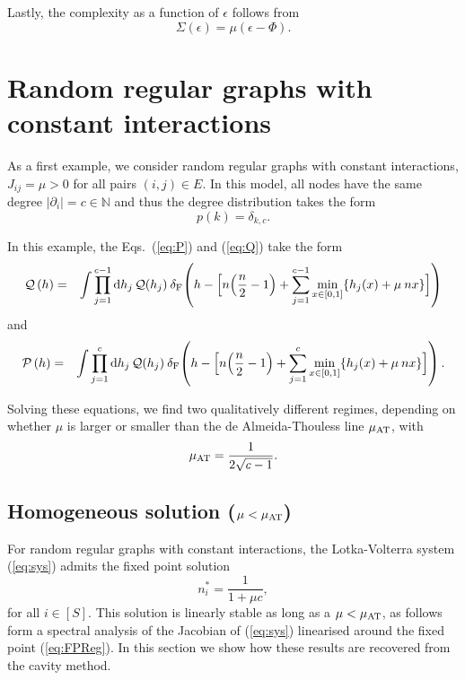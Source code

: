 \documentclass[11pt,a4paper]{article}
\begin{document}
Lastly, the complexity as a function of $\epsilon$ follows from 
\begin{equation}
\Sigma(\epsilon) = \mu (\epsilon-\Phi).   \label{eq:SigmaF}
\end{equation}


\section{Random regular graphs with constant interactions}\label{sec:reg}
As a first example, we consider random regular graphs with constant interactions, $J_{ij} = \mu>0$ for all pairs $(i,j)\in E$.     In this model, all nodes have the same 
 degree $|\partial_i| = c \in\mathbb{N}$ and thus the degree distribution takes the form 
\begin{equation}
   p(k)=\delta_{k,c}  .
\end{equation} 



In this example, the  Eqs.~(\ref{eq:P}) and (\ref{eq:Q}) take the form 
\begin{eqnarray}
    \mathcal{Q}\left( h \right)
    &=& \int \prod_{j=1}^{c-1} \mathrm{d}h_j\,\mathcal{Q}(h_j)
\:  \delta_{{\rm F}}\!\left(
      h - \Big[ n\!\left(\frac{n}{2}-1\right)
      + \sum_{j=1}^{c-1} \min_{x\in[0,1]}\{h_j(x)+ \mu \:  n x\}\Big]
    \right) \label{eq:QReg}
\end{eqnarray} 
and
\begin{eqnarray}
    \mathcal{P}\left( h \right)
    &=& \int \prod_{j=1}^{c} \mathrm{d}h_j\,\mathcal{Q}(h_j)
\:  \delta_{{\rm F}}\!\left(
      h - \Big[ n\!\left(\frac{n}{2}-1\right)
      + \sum_{j=1}^{c} \min_{x\in[0,1]}\{h_j(x)+ \mu \:  n x\}\Big]
    \right) .\label{eq:PReg}
\end{eqnarray} 

Solving these equations, we find  two qualitatively different regimes, depending on whether $\mu$ is larger or smaller than the de Almeida-Thouless  line $\mu_{\rm AT}$, with 
\begin{equation}
 \mu_{\rm AT}  = \frac{1}{2\sqrt{c-1}}.
\end{equation}


\subsection{Homogeneous solution ($\mu<\mu_{\rm AT}$)}
For random regular graphs with constant interactions, the Lotka-Volterra   system  (\ref{eq:sys}) admits the fixed point solution 
\begin{equation}
n^\ast_i =  \frac{1}{1+\mu c},\label{eq:FPReg}
\end{equation}
for all $i\in [S]$.     
This solution is linearly stable as  long as a $\mu<\mu_{\rm AT}$, 
as follows form a spectral analysis of the Jacobian of (\ref{eq:sys}) linearised around the fixed point (\ref{eq:FPReg}).  In this section we show how these results are recovered from the cavity method.      
\end{document}
